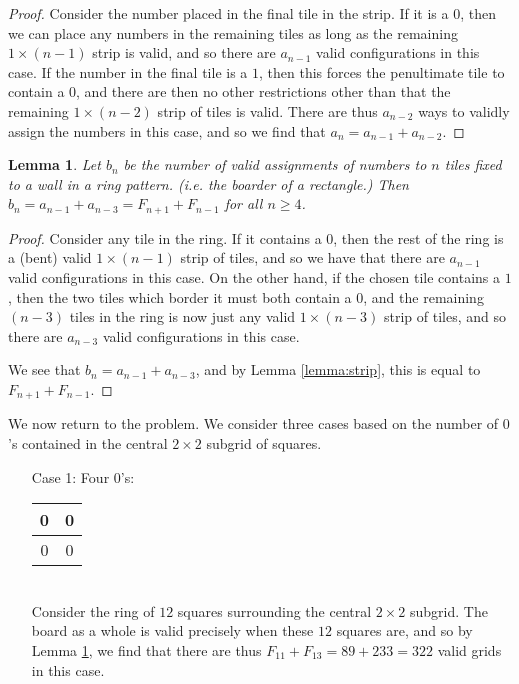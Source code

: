 \documentclass[a4paper,12pt, titlepage]{article}
\newtheorem{lemma}{Lemma}
\newcommand{\grid}[4]{ %
    \begin{tabular}{|c|c|} %
        \hline %
        #1 & #2 \\
        \hline %
        #3 & #4 \\
        \hline %
    \end{tabular} %
}
\begin{document}
\begin{enumerate}
\begin{proof}
        Consider the number placed in the final tile in the strip. If it is a
        $0$, then we can place any numbers in the remaining tiles as long as
        the remaining $1 \times (n-1)$ strip is valid, and so there are
        $a_{n-1}$ valid configurations in this case. If the number in the final
        tile is a $1$,
        then this forces the penultimate tile to contain a $0$, and there
        are then no other restrictions other than that the remaining $1 \times
        (n-2)$ strip of tiles is valid. There are thus $a_{n-2}$ ways to validly
        assign the numbers in this case, and so we find that $a_n = a_{n-1} +
        a_{n-2}$.
    \end{proof}

    \begin{lemma} \label{lemma:ring}
        Let $b_n$ be the number of valid assignments of numbers to $n$ tiles
        fixed to a wall in a ring pattern. (i.e. the boarder of a
        rectangle.) Then
        $b_n = a_{n-1} + a_{n-3} = F_{n+1} + F_{n-1}$ for all $n \geq 4$.
    \end{lemma}
    \begin{proof}
        Consider any tile in the ring. If it contains a $0$, then the rest of
        the ring is a (bent) valid $1 \times (n-1)$ strip of tiles, and so we
        have that there are $a_{n-1}$ valid configurations in this case. On the
        other hand, if the chosen tile contains a $1$, then the two tiles
        which border it must both contain a $0$, and the remaining $(n-3)$
        tiles in the ring is now just any valid $1 \times (n-3)$ strip of
        tiles, and so there are $a_{n-3}$ valid configurations in this case.
     
        We see that $b_n = a_{n-1} + a_{n-3}$, and by Lemma \ref{lemma:strip},
        this is equal to $F_{n+1} + F_{n-1}$.
    \end{proof}

We now return to the problem. We consider three cases based on the number
of $0$'s contained in the central $2 \times 2$ subgrid of squares.

\begin{enumerate}

    \item[Case 1:] Four $0$'s: \grid{0}{0}{0}{0} \\
        
        Consider the ring of $12$ squares surrounding the central $2 \times
        2$ subgrid. The board as a whole is valid precisely when these $12$
        squares are, and so by Lemma \ref{lemma:ring}, we find that there
        are thus $F_{11} + F_{13} = 89 + 233 = 322$ valid grids in this case.


\end{enumerate}
\end{enumerate}
\end{document}
